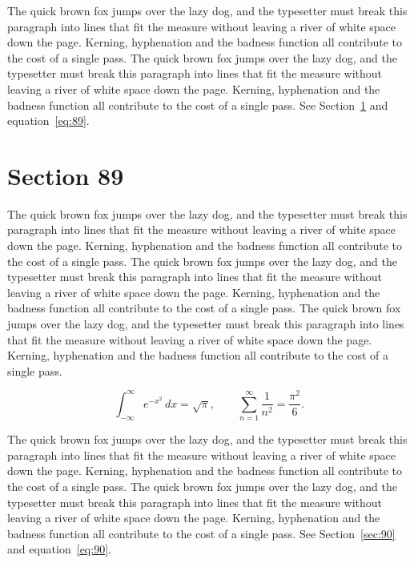 \documentclass{article}
\begin{document}
The quick brown fox jumps over the lazy dog, and the typesetter must break this paragraph into lines that fit the measure without leaving a river of white space down the page. Kerning, hyphenation and the badness function all contribute to the cost of a single pass. The quick brown fox jumps over the lazy dog, and the typesetter must break this paragraph into lines that fit the measure without leaving a river of white space down the page. Kerning, hyphenation and the badness function all contribute to the cost of a single pass. 
See Section~\ref{sec:89} and equation~\eqref{eq:89}.
\section{Section 89}
\label{sec:89}
The quick brown fox jumps over the lazy dog, and the typesetter must break this paragraph into lines that fit the measure without leaving a river of white space down the page. Kerning, hyphenation and the badness function all contribute to the cost of a single pass. The quick brown fox jumps over the lazy dog, and the typesetter must break this paragraph into lines that fit the measure without leaving a river of white space down the page. Kerning, hyphenation and the badness function all contribute to the cost of a single pass. The quick brown fox jumps over the lazy dog, and the typesetter must break this paragraph into lines that fit the measure without leaving a river of white space down the page. Kerning, hyphenation and the badness function all contribute to the cost of a single pass. 

\begin{equation}\label{eq:89}
\int_{-\infty}^{\infty} e^{-x^{2}}\,dx = \sqrt{\pi}, \qquad
\sum_{n=1}^{\infty} \frac{1}{n^{2}} = \frac{\pi^{2}}{6}.
\end{equation}

The quick brown fox jumps over the lazy dog, and the typesetter must break this paragraph into lines that fit the measure without leaving a river of white space down the page. Kerning, hyphenation and the badness function all contribute to the cost of a single pass. The quick brown fox jumps over the lazy dog, and the typesetter must break this paragraph into lines that fit the measure without leaving a river of white space down the page. Kerning, hyphenation and the badness function all contribute to the cost of a single pass. 
See Section~\ref{sec:90} and equation~\eqref{eq:90}.
\end{document}
